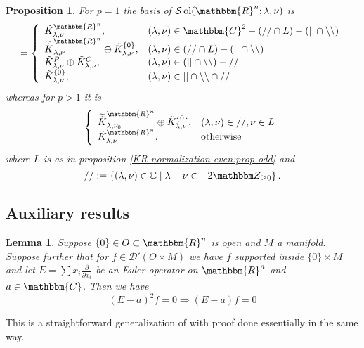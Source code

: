 \documentclass{article}
\newcommand{\tmop}[1]{\ensuremath{\operatorname{#1}}}
\numberwithin{definition}{section}
\newtheorem{lemma}{Lemma}
\numberwithin{lemma}{section}
\newtheorem{proposition}{Proposition}
\numberwithin{proposition}{section}
{\theorembodyfont{\rmfamily}\newtheorem{remark}{Remark}
\numberwithin{remark}{section}
}
\begin{document}
\begin{proposition}
	\label{sol-MO:prop-main}For $p = 1$ the basis of $\mathcal{S}\tmop{ol}( \mathbbm{R}^n ; \lambda, \nu)$ is
  \[=\left\{
     \begin{array}{ll}
       \tilde{K}_{\lambda, \nu}^{\mathbbm{R}^n}, & ( \lambda, \nu) \in
       \mathbbm{C}^2 - ( / / \cap L) - ( | | \cap \backslash\backslash)\\
       \widetilde{\tilde{K}}_{\lambda, \nu}^{\mathbbm{R}^n} \oplus
       \tilde{K}^{\{ 0 \}}_{\lambda, \nu}, & ( \lambda, \nu) \in ( / / \cap L)
       - ( | | \cap \backslash\backslash)\\
       \tilde{K}_{\lambda, \nu}^P \oplus \tilde{K}_{\lambda, \nu}^C, & (
       \lambda, \nu) \in ( | | \cap \backslash\backslash) - / /\\
       \tilde{K}^{\{ 0 \}}_{\lambda, \nu}, & ( \lambda, \nu) \in | | \cap
       \backslash\backslash \cap / /
     \end{array} \right. \]
  whereas for $p > 1$ it is 
  \[\left\{
     \begin{array}{ll}
\widetilde{\tilde{K}}_{\lambda, \nu_0}^{\mathbbm{R}^n}
       \oplus \tilde{K}^{\{ 0
       \}}_{\lambda, \nu}, & ( \lambda, \nu) \in / /, \nu \in L\\
       \tilde{K}^{\mathbbm{R}^n}_{\lambda, \nu}, & \tmop{otherwise}
     \end{array} \right. \]
     where $L$ is as in proposition \ref{KR-normalization-even:prop-odd} and 
     \[//:=\left\{ \left( \lambda,\nu \right)\in \mathbb{C} \mid\lambda-\nu\in-2\Z_{\ge0}\right\}.\]
\end{proposition}

\subsection{Auxiliary results}

\begin{lemma}
  \label{sol-MO:lem-E2}Suppose $\{ 0 \} \in O \subset \mathbbm{R}^n$ is open
  and $M$ a manifold. Suppose further that for $f \in \mathcal{D}' ( O \times
  M)$ we have $f$ supported inside $\{ 0 \} \times M$ and let $E = \sum x_i
  \frac{\partial}{\partial x_i}$ be an Euler operator on $\mathbbm{R}^n$ and
  $a \in \mathbbm{C}$. Then we have
  \[ ( E - a)^2 f = 0 \Rightarrow ( E - a) f = 0 \]
\end{lemma}

\begin{remark}
  This is a straightforward generalization of {\cite[lem.
  11.11]{kobayashi2015symmetry}} with proof done essentially in the same way.
\end{remark}
\end{document}

